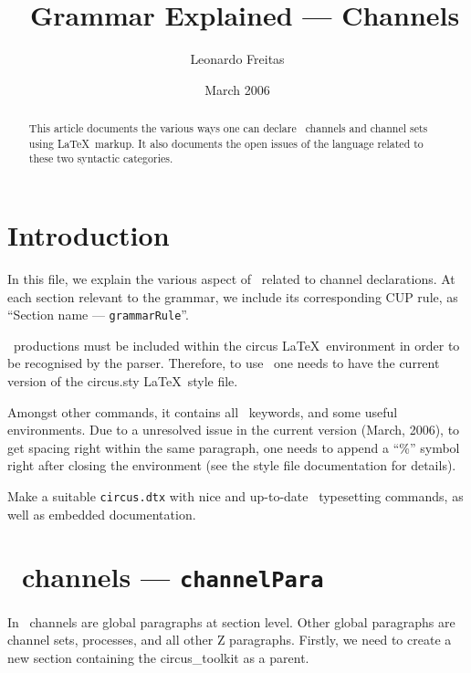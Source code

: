 \documentclass{article}
\newcommand{\grammar}[1]{\texttt{#1}}
\begin{document}
\title{\Circus\ Grammar Explained --- Channels}
\author{Leonardo Freitas}
\date{March 2006}

\maketitle

\begin{abstract}
    \noindent This article documents the various ways one can declare \Circus\ channels and channel sets
    using \LaTeX\ markup.  It also documents the open issues of the language related to these two syntactic
    categories.
\end{abstract}

\section{Introduction}

In this file, we explain the various aspect of \Circus\ related to channel
declarations. At each section relevant to the grammar, we include its
corresponding CUP rule, as ``Section name --- \texttt{grammarRule}''.

\Circus\ productions must be included within the \textsf{circus} \LaTeX\
environment in order to be recognised by the parser. Therefore, to use \Circus\
one needs to have the current version of the \textsf{circus.sty} \LaTeX\ style
file.

Amongst other commands, it contains all \Circus\ keywords, and some useful
environments. Due to a unresolved issue in the current version (March, 2006),
to get spacing right within the same paragraph, one needs to append a ``\%''
symbol right after closing the environment (see the style file documentation
for details).

\begin{issue}
   Make a suitable \texttt{circus.dtx} with nice and up-to-date \Circus\
   typesetting commands, as well as embedded documentation.
\end{issue}

\section{\Circus\ channels --- \grammar{channelPara}}

In \Circus\ channels are global paragraphs at section level. Other global
paragraphs are channel sets, processes, and all other Z paragraphs. Firstly, we
need to create a new section containing the \textsf{circus\_toolkit} as a
parent.
\end{document}

